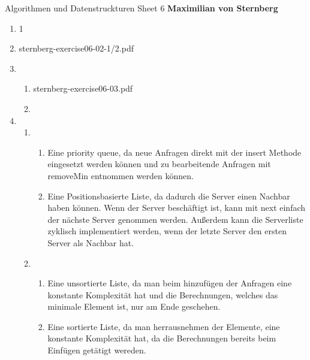 \documentclass[]{book}
\theoremstyle{definition}
\begin{document}
\begin{center}
{\Large Algorithmen und Datenstruckturen \hspace{0.5cm} Sheet 6}
\textbf{Maximilian von Sternberg} %
\end{center}
\begin{enumerate}
    \item 1
    \item sternberg-exercise06-02-1/2.pdf
    \item \begin{enumerate}
        \item sternberg-exercise06-03.pdf
        \item 
    \end{enumerate}
    \item \begin{enumerate}
        \item \begin{enumerate}
            \item Eine priority queue, da neue Anfragen direkt mit der insert Methode eingesetzt werden können und zu bearbeitende Anfragen mit removeMin entnommen werden können.
            \item Eine Positionsbasierte Liste, da dadurch die Server einen Nachbar haben können. Wenn der Server beschäftigt ist, kann mit next einfach der nächste Server genommen werden. Außerdem kann die Serverliste zyklisch implementiert werden, wenn der letzte Server den ersten Server als Nachbar hat.
        \end{enumerate}
        \item \begin{enumerate}
            \item Eine unsortierte Liste, da man beim hinzufügen der Anfragen eine konstante Komplexität hat und die Berechnungen, welches das minimale Element ist, nur am Ende geschehen.
            \item Eine sortierte Liste, da man herrausnehmen der Elemente, eine konstante Komplexität hat, da die Berechnungen bereits beim Einfügen getätigt wereden. 
        \end{enumerate}
    \end{enumerate}
\end{enumerate}
\vspace{0.2 cm}
\end{document}
